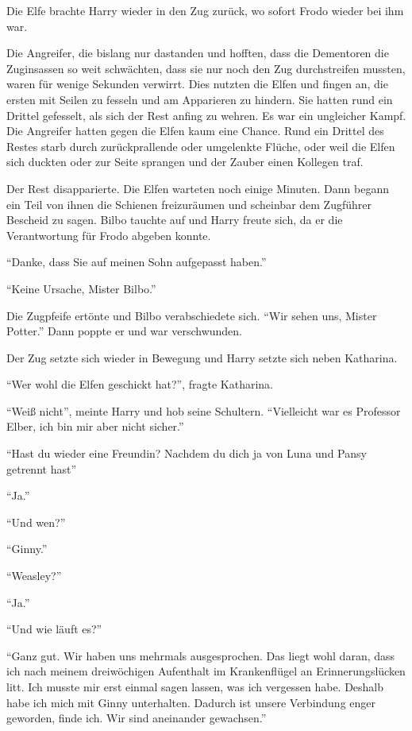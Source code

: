 Die Elfe brachte Harry wieder in den Zug zurück, wo sofort Frodo wieder bei ihm war.

Die Angreifer, die bislang nur dastanden und hofften, dass die Dementoren die Zuginsassen so weit schwächten, dass sie nur noch den Zug durchstreifen mussten, waren für wenige Sekunden verwirrt. Dies nutzten die Elfen und fingen an, die ersten mit Seilen zu fesseln und am Apparieren zu hindern. Sie hatten rund ein Drittel gefesselt, als sich der Rest anfing zu wehren. Es war ein ungleicher Kampf. Die Angreifer hatten gegen die Elfen kaum eine Chance. Rund ein Drittel des Restes starb durch zurückprallende oder umgelenkte Flüche, oder weil die Elfen sich duckten oder zur Seite sprangen und der Zauber einen Kollegen traf.

Der Rest disapparierte. Die Elfen warteten noch einige Minuten. Dann begann ein Teil von ihnen die Schienen freizuräumen und scheinbar dem Zugführer Bescheid zu sagen. Bilbo tauchte auf und Harry freute sich, da er die Verantwortung für Frodo abgeben konnte.

\enquote{Danke, dass Sie auf meinen Sohn aufgepasst haben.}

\enquote{Keine Ursache, Mister Bilbo.}

Die Zugpfeife ertönte und Bilbo verabschiedete sich. \enquote{Wir sehen uns, Mister Potter.} Dann poppte er und war verschwunden.

Der Zug setzte sich wieder in Bewegung und Harry setzte sich neben Katharina.

\enquote{Wer wohl die Elfen geschickt hat?}, fragte Katharina.

\enquote{Weiß nicht}, meinte Harry und hob seine Schultern. \enquote{Vielleicht war es Professor Elber, ich bin mir aber nicht sicher.}

\enquote{Hast du wieder eine Freundin? Nachdem du dich ja von Luna und Pansy getrennt hast\abs}

\enquote{Ja.}

\enquote{Und wen?}

\enquote{Ginny.}

\enquote{Weasley?}

\enquote{Ja.}

\enquote{Und wie läuft es?}

\enquote{Ganz gut. Wir haben uns mehrmals ausgesprochen. Das liegt wohl daran, dass ich nach meinem dreiwöchigen Aufenthalt im Krankenflügel an Erinnerungslücken litt. Ich musste mir erst einmal sagen lassen, was ich vergessen habe. Deshalb habe ich mich mit Ginny unterhalten. Dadurch ist unsere Verbindung enger geworden, finde ich. Wir sind aneinander gewachsen.}

